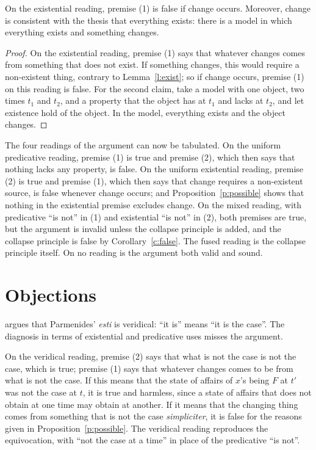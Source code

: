 \documentclass{situationist-preprint}
\begin{document}
\begin{proposition}\label{p:possible}
On the existential reading, premise (1) is false if change occurs. Moreover, change is consistent with the thesis that everything exists: there is a model in which everything exists and something changes.
\end{proposition}

\begin{proof}
On the existential reading, premise (1) says that whatever changes comes from something that does not exist. If something changes, this would require a non-existent thing, contrary to Lemma~\ref{l:exist}; so if change occurs, premise (1) on this reading is false. For the second claim, take a model with one object, two times $t_1$ and $t_2$, and a property that the object has at $t_1$ and lacks at $t_2$, and let existence hold of the object. In the model, everything exists and the object changes.
\end{proof}

The four readings of the argument can now be tabulated. On the uniform predicative reading, premise (1) is true and premise (2), which then says that nothing lacks any property, is false. On the uniform existential reading, premise (2) is true and premise (1), which then says that change requires a non-existent source, is false whenever change occurs; and Proposition~\ref{p:possible} shows that nothing in the existential premise excludes change. On the mixed reading, with predicative \enquote{is not} in (1) and existential \enquote{is not} in (2), both premises are true, but the argument is invalid unless the collapse principle is added, and the collapse principle is false by Corollary~\ref{c:false}. The fused reading is the collapse principle itself. On no reading is the argument both valid and sound.

\section{Objections}

\begin{objection}
\citet{Kahn1966} argues that Parmenides' \emph{esti} is veridical: \enquote{it is} means \enquote{it is the case}. The diagnosis in terms of existential and predicative uses misses the argument.
\end{objection}

\begin{reply}
On the veridical reading, premise (2) says that what is not the case is not the case, which is true; premise (1) says that whatever changes comes to be from what is not the case. If this means that the state of affairs of $x$'s being $F$ at $t'$ was not the case at $t$, it is true and harmless, since a state of affairs that does not obtain at one time may obtain at another. If it means that the changing thing comes from something that is not the case \emph{simpliciter}, it is false for the reasons given in Proposition~\ref{p:possible}. The veridical reading reproduces the equivocation, with \enquote{not the case at a time} in place of the predicative \enquote{is not}.
\end{reply}
\end{document}
